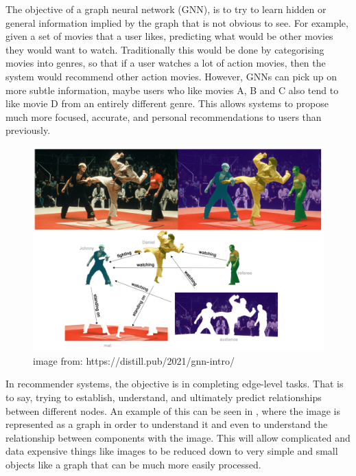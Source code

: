 \documentclass{l4proj}
\begin{document}
The objective of a graph neural network (GNN), is to try to learn hidden or general information implied by the graph that is not obvious to see. For example, given a set of movies that a user likes, predicting what would be other movies they would want to watch. Traditionally this would be done by categorising movies into genres, so that if a user watches a lot of action movies, then the system would recommend other action movies. However, GNNs can pick up on more subtle information, maybe users who like movies A, B and C also tend to like movie D from an entirely different genre. This allows systems to propose much more focused, accurate, and personal recommendations to users than previously. \\

\begin{figure}[h]
    \centering
    \includegraphics[width=\linewidth]{images/image_recognition.png}
    \caption{image from: https://distill.pub/2021/gnn-intro/}
    \label{fig:image_recogniton}
\end{figure}

In recommender systems, the objective is in completing edge-level tasks. That is to say, trying to establish, understand, and ultimately predict relationships between different nodes. An example of this can be seen in , where the image is represented as a graph in order to understand it and even to understand the relationship between components with the image. This will allow complicated and data expensive things like images to be reduced down to very simple and small objects like a graph that can be much more easily processed.
\end{document}

